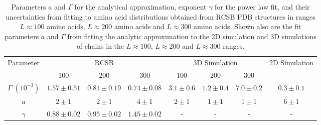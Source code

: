 \documentclass[notitlepage,
reprint,%
onecolumn,
amsmath,amssymb,superscriptaddress,aps,
pre,floatfix]{revtex4-1}
\begin{document}
\begin{table}[tb] 
\centering
\setlength{\tabcolsep}{10pt}
{\renewcommand{\arraystretch}{1.5}
\begin{tabular}{c c c c c c c c}
\hline
\multirow{2}{*}{Parameter}&\multicolumn{3}{c}{RCSB}& \multicolumn{3}{c}{3D Simulation}&\multirow{2}{*}{2D Simulation}
\\&100&200&300&100&200&300&\\
\hline
$\Gamma\; (10^{-3})$ & $1.57 \pm 0.51$ & $0.81 \pm 0.19 $ & $0.74 \pm 0.08$ & $3.1 \pm 0.6$ & $1.2 \pm 0.4$ & $7.0 \pm 0.2$ & $0.3 \pm 0.1$ \\
$a$ & $2 \pm 1$ & $2 \pm 1$ & $4 \pm 1$ & $2 \pm 1$ & $1 \pm 1$ & $1 \pm 1$ & $6 \pm 1$ \\
$\gamma$ & $0.88 \pm 0.02$ & $0.95 \pm 0.02$ & $1.45 \pm 0.02$ & - & - & - & - \\
 \hline
\end{tabular}
}
 \caption{Parameters $a$ and $\Gamma$ for the analytical approximation, exponent $\gamma$ for the power law fit, and their uncertainties from fitting to amino acid distributions obtained from RCSB PDB structures in ranges $L\approx100$ amino acids, $L\approx200$ amino acids and $L\approx300$ amino acids. Shown also are the fit parameters $a$ and $\Gamma$ from fitting the analytic approximation to the 2D simulation and 3D simulations of chains in the $L\approx100$, $L\approx200$ and $L\approx300$ ranges.}
\label{table:stats}
\end{table}




\begin{figure*}[htb]
\end{figure*}

\end{document}
